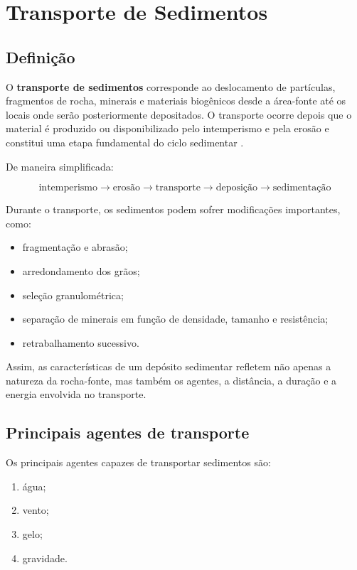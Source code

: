 \section{Transporte de Sedimentos}

\subsection{Definição}

O \textbf{transporte de sedimentos} corresponde ao deslocamento de partículas,
fragmentos de rocha, minerais e materiais biogênicos desde a área-fonte até os
locais onde serão posteriormente depositados. O transporte ocorre depois que o
material é produzido ou disponibilizado pelo intemperismo e pela erosão e
constitui uma etapa fundamental do ciclo sedimentar \parencite{nichols2009}.

De maneira simplificada:

\[
\boxed{
\text{intemperismo}
\rightarrow
\text{erosão}
\rightarrow
\text{transporte}
\rightarrow
\text{deposição}
\rightarrow
\text{sedimentação}
}
\]

Durante o transporte, os sedimentos podem sofrer modificações importantes, como:

\begin{itemize}
    \item fragmentação e abrasão;
    \item arredondamento dos grãos;
    \item seleção granulométrica;
    \item separação de minerais em função de densidade, tamanho e resistência;
    \item retrabalhamento sucessivo.
\end{itemize}

Assim, as características de um depósito sedimentar refletem não apenas a
natureza da rocha-fonte, mas também os agentes, a distância, a duração e a
energia envolvida no transporte.

\subsection{Principais agentes de transporte}

Os principais agentes capazes de transportar sedimentos são:

\begin{enumerate}
    \item água;
    \item vento;
    \item gelo;
    \item gravidade.
\end{enumerate}

